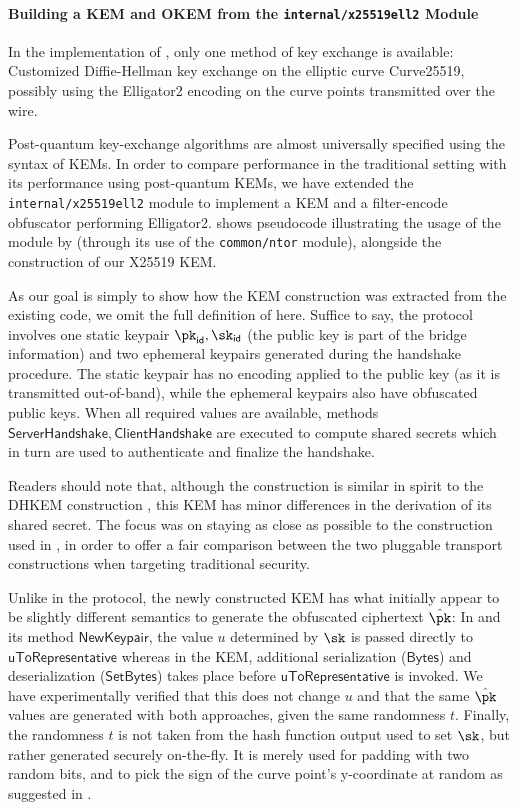 \paragraph{Building a KEM and OKEM from the \texttt{internal/x25519ell2} Module}

In the implementation of \obfsfour{}, only one method of key exchange is available: Customized Diffie-Hellman key exchange on the elliptic curve Curve25519, possibly using the \textsf{Elligator2} encoding on the curve points transmitted over the wire.

Post-quantum key-exchange algorithms are almost universally specified using the syntax of KEMs. In order to compare \drivel{} performance in the traditional setting with its performance using post-quantum KEMs, we have extended the \texttt{internal/x25519ell2} module to implement a KEM and a filter-encode obfuscator performing \textsf{Elligator2}.  shows pseudocode illustrating the usage of the module by \obfsfour{} (through its use of the \texttt{common/ntor} module), alongside the construction of our X25519 KEM.

As our goal is simply to show how the KEM construction was extracted from the existing code, we omit the full definition of \obfsfour{} here. Suffice to say, the protocol involves one static keypair $\pk_\mathsf{id}, \sk_\mathsf{id}$ (the public key is part of the bridge information) and two ephemeral keypairs generated during the handshake procedure. The static keypair has no encoding applied to the public key (as it is transmitted out-of-band), while the ephemeral keypairs also have obfuscated public keys. When all required values are available, methods $\mathsf{ServerHandshake}, \mathsf{ClientHandshake}$ are executed to compute shared secrets which in turn are used to authenticate and finalize the handshake.

Readers should note that, although the construction is similar in spirit to the DHKEM construction \cite[Section~4.1]{rfc9180}, this KEM has minor differences in the derivation of its shared secret. The focus was on staying as close as possible to the construction used in \obfsfour{}, in order to offer a fair comparison between the two pluggable transport constructions when targeting traditional security.

Unlike in the \obfsfour{} protocol, the newly constructed KEM has what initially appear to be slightly different semantics to generate the obfuscated ciphertext $\hat \pk$:
In \obfsfour{} and its method $\mathsf{NewKeypair}$, the value $u$ determined by $\sk$ is passed directly to $\mathsf{uToRepresentative}$ whereas in the KEM, additional serialization ($\mathsf{Bytes}$) and deserialization ($\mathsf{SetBytes}$) takes place before $\mathsf{uToRepresentative}$ is invoked.
We have experimentally verified that this does not change $u$ and that the same $\hat \pk$ values are generated with both approaches, given the same randomness $t$.
Finally, the randomness $t$ is not taken from the hash function output used to set $\sk$, but rather generated securely on-the-fly. It is merely used for padding with two random bits, and to pick the sign of the curve point's y-coordinate at random as suggested in \cite{elligatorExplicitFormulas}.

